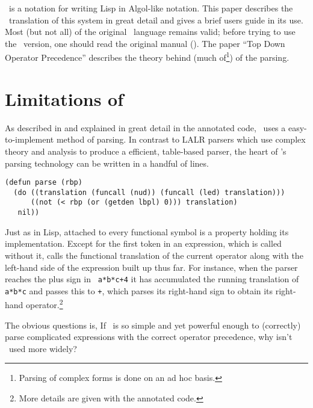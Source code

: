\cgol\ is a notation for writing Lisp in Algol-like notation.  This paper
describes the \cl\ translation of this system in great detail and gives a
brief users guide in its use.  Most (but not all) of the original \cgol\
language remains valid; before trying to use the \cl\ version, one should
read the original manual (\code{cgol.man}).  The paper ``Top Down
Operator Precedence'' \cite{pratt:top} describes the theory behind (much
of\footnote{Parsing of complex forms is done on an ad hoc basis.}) of the
parsing.


\section {Limitations of \cgol}

As described in \cite {pratt:top} and explained in great detail in the
annotated code, \cgol\ uses a easy-to-implement method of
parsing.  In contrast to LALR parsers which use complex theory and analysis
to produce a efficient, table-based parser, the heart of \cgol's parsing
technology can be written in a handful of lines.

 {\footnotesize\begin{verbatim}
(defun parse (rbp) 
  (do ((translation (funcall (nud)) (funcall (led) translation))) 
      ((not (< rbp (or (getden lbpl) 0))) translation) 
   nil))
\end{verbatim}}

Just as in Lisp, attached to every functional symbol is a property holding its
implementation.  Except for the first token in an expression, which is
called without it, \code{parse} calls the functional translation of the
current operator along with the left-hand side of the expression built up
thus far.  For instance, when the parser reaches the plus sign in {\tt
a*b*c+4} it has accumulated the running translation of {\tt a*b*c} and
passes this to {\tt +}, which parses its right-hand sign to obtain its
right-hand operator.\footnote{More details are given with the annotated
code.}

The obvious questions is, If \cgol\ is so simple and yet powerful enough to
(correctly) parse complicated expressions with the correct operator
precedence, why isn't \cgol\ used more widely?



